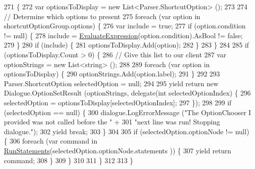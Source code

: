 \begin{DoxyCode}
271         \{
272             var optionsToDisplay = \textcolor{keyword}{new} List<Parser.ShortcutOption> ();
273 
274             \textcolor{comment}{// Determine which options to present}
275             \textcolor{keywordflow}{foreach} (var option \textcolor{keywordflow}{in} shortcutOptionGroup.options) \{
276                 var include = \textcolor{keyword}{true};
277                 \textcolor{keywordflow}{if} (option.condition != null) \{
278                     include = \hyperlink{a00083_ac57271c72da4ec456a32c94d951c8b65}{EvaluateExpression}(option.condition).AsBool != \textcolor{keyword}{false};
279                 \}
280                 \textcolor{keywordflow}{if} (include) \{
281                     optionsToDisplay.Add(option);
282                 \}
283             \}
284 
285             \textcolor{keywordflow}{if} (optionsToDisplay.Count > 0) \{
286                 \textcolor{comment}{// Give this list to our client}
287                 var optionStrings = \textcolor{keyword}{new} List<string> ();
288 
289                 \textcolor{keywordflow}{foreach} (var option \textcolor{keywordflow}{in} optionsToDisplay) \{
290                     optionStrings.Add(option.label);
291                 \}
292 
293                 Parser.ShortcutOption selectedOption = null;
294 
295                 yield \textcolor{keywordflow}{return} \textcolor{keyword}{new} Dialogue.OptionSetResult (optionStrings, delegate(\textcolor{keywordtype}{int} selectedOptionIndex)
       \{
296                     selectedOption = optionsToDisplay[selectedOptionIndex];
297                 \});
298 
299                 \textcolor{keywordflow}{if} (selectedOption == null) \{
300                     dialogue.LogErrorMessage (\textcolor{stringliteral}{"The OptionChooser I provided was not called before the "} +
301                         \textcolor{stringliteral}{"next line was run! Stopping dialogue."});
302                     yield \textcolor{keywordflow}{break};
303                 \}
304 
305                 \textcolor{keywordflow}{if} (selectedOption.optionNode != null) \{
306                     \textcolor{keywordflow}{foreach} (var command \textcolor{keywordflow}{in} \hyperlink{a00083_aa436557ec45c8e98d194d9af139d9170}{RunStatements}(selectedOption.optionNode.statements
      )) \{
307                         yield \textcolor{keywordflow}{return} command;
308                     \}
309                 \}
310                     
311             \}
312 
313         \}
\end{DoxyCode}

